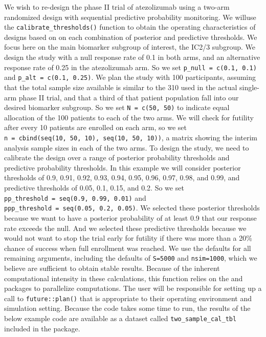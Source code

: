 We wish to re-design the phase II trial of atezolizumab using a two-arm
randomized design with sequential predictive probability monitoring. We
willuse the \texttt{calibrate\_thresholds()} function to obtain the
operating characteristics of designs based on on each combination of
posterior and predictive thresholds. We focus here on the main biomarker
subgroup of interest, the IC2/3 subgroup. We design the study with a
null response rate of 0.1 in both arms, and an alternative response rate
of 0.25 in the atezolizumab arm. So we set
\texttt{p\_null\ =\ c(0.1,\ 0.1)} and \texttt{p\_alt\ =\ c(0.1,\ 0.25)}.
We plan the study with 100 participants, assuming that the total sample
size available is similar to the 310 used in the actual single-arm phase
II trial, and that a third of that patient population fall into our
desired biomarker subgroup. So we set \texttt{N\ =\ c(50,\ 50)} to
indicate equal allocation of the 100 patients to each of the two arms.
We will check for futility after every 10 patients are enrolled on each
arm, so we set
\texttt{n\ =\ cbind(seq(10,\ 50,\ 10),\ seq(10,\ 50,\ 10))}, a matrix
showing the interim analysis sample sizes in each of the two arms. To
design the study, we need to calibrate the design over a range of
posterior probability thresholds and predictive probability thresholds.
In this example we will consider posterior thresholds of 0.9, 0.91,
0.92, 0.93, 0.94, 0.95, 0.96, 0.97, 0.98, and 0.99, and predictive
thresholds of 0.05, 0.1, 0.15, and 0.2. So we set
\texttt{pp\_threshold\ =\ seq(0.9,\ 0.99,\ 0.01)} and
\texttt{ppp\_threshold\ =\ seq(0.05,\ 0.2,\ 0.05)}. We selected these
posterior thresholds because we want to have a posterior probability of
at least 0.9 that our response rate exceeds the null. And we selected
these predictive thresholds because we would not want to stop the trial
early for futility if there was more than a 20\% chance of success when
full enrollment was reached. We use the defaults for all remaining
arguments, including the defaults of \texttt{S=5000} and
\texttt{nsim=1000}, which we believe are sufficient to obtain stable
results. Because of the inherent computational intensity in these
calculations, this function relies on the 
\citep{Bengtsson2021} and  \citep{Vaughan2021} packages
to parallelize computations. The user will be responsible for setting up
a call to \texttt{future::plan()} that is appropriate to their operating
environment and simulation setting. Because the code takes some time to
run, the results of the below example code are available as a dataset
called \texttt{two\_sample\_cal\_tbl} included in the 
package.

